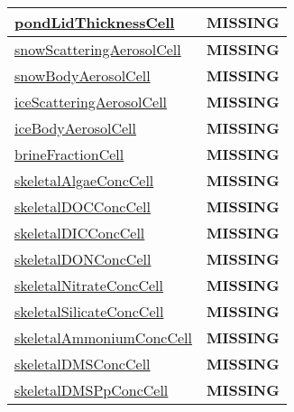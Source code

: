 {\begin{center}
\begin{longtable}{| p{2.0in} | p{4.0in} |}
    \hline
    \hyperref[subsec:var_sec_tracers_aggregate_pondLidThicknessCell]{pondLidThicknessCell} & {\bf \color{red} MISSING} \\
    \hline
    \hyperref[subsec:var_sec_tracers_aggregate_snowScatteringAerosolCell]{snowScatteringAerosolCell} & {\bf \color{red} MISSING} \\
    \hline
    \hyperref[subsec:var_sec_tracers_aggregate_snowBodyAerosolCell]{snowBodyAerosolCell} & {\bf \color{red} MISSING} \\
    \hline
    \hyperref[subsec:var_sec_tracers_aggregate_iceScatteringAerosolCell]{iceScatteringAerosolCell} & {\bf \color{red} MISSING} \\
    \hline
    \hyperref[subsec:var_sec_tracers_aggregate_iceBodyAerosolCell]{iceBodyAerosolCell} & {\bf \color{red} MISSING} \\
    \hline
    \hyperref[subsec:var_sec_tracers_aggregate_brineFractionCell]{brineFractionCell} & {\bf \color{red} MISSING} \\
    \hline
    \hyperref[subsec:var_sec_tracers_aggregate_skeletalAlgaeConcCell]{skeletalAlgaeConcCell} & {\bf \color{red} MISSING} \\
    \hline
    \hyperref[subsec:var_sec_tracers_aggregate_skeletalDOCConcCell]{skeletalDOCConcCell} & {\bf \color{red} MISSING} \\
    \hline
    \hyperref[subsec:var_sec_tracers_aggregate_skeletalDICConcCell]{skeletalDICConcCell} & {\bf \color{red} MISSING} \\
    \hline
    \hyperref[subsec:var_sec_tracers_aggregate_skeletalDONConcCell]{skeletalDONConcCell} & {\bf \color{red} MISSING} \\
    \hline
    \hyperref[subsec:var_sec_tracers_aggregate_skeletalNitrateConcCell]{skeletalNitrateConcCell} & {\bf \color{red} MISSING} \\
    \hline
    \hyperref[subsec:var_sec_tracers_aggregate_skeletalSilicateConcCell]{skeletalSilicateConcCell} & {\bf \color{red} MISSING} \\
    \hline
    \hyperref[subsec:var_sec_tracers_aggregate_skeletalAmmoniumConcCell]{skeletalAmmoniumConcCell} & {\bf \color{red} MISSING} \\
    \hline
    \hyperref[subsec:var_sec_tracers_aggregate_skeletalDMSConcCell]{skeletalDMSConcCell} & {\bf \color{red} MISSING} \\
    \hline
    \hyperref[subsec:var_sec_tracers_aggregate_skeletalDMSPpConcCell]{skeletalDMSPpConcCell} & {\bf \color{red} MISSING} \\

\end{longtable}
\end{center}}
